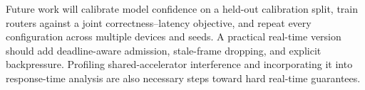 Future work will calibrate model confidence on a held-out calibration split,
train routers against a joint correctness--latency objective, and repeat every
configuration across multiple devices and seeds.  A practical real-time
version should add deadline-aware admission, stale-frame dropping, and explicit
backpressure.  Profiling shared-accelerator interference and incorporating it
into response-time analysis are also necessary steps toward hard real-time
guarantees.

